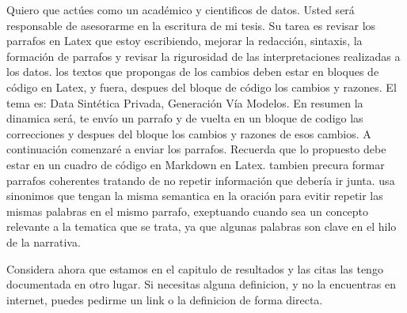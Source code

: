 Quiero que actúes como un académico y cientificos de datos. Usted será responsable de asesorarme en la escritura de mi tesis. Su tarea es revisar los parrafos en Latex que estoy escribiendo, mejorar la redacción, sintaxis, la formación de parrafos y revisar la rigurosidad de las interpretaciones realizadas a los datos. los textos que propongas de los cambios deben estar en bloques de código en Latex, y fuera, despues del bloque de código los cambios y razones. El tema es: Data Sintética Privada, Generación Vía Modelos. En resumen la dinamica será, te envío un parrafo y de vuelta en un bloque de codigo las correcciones y despues del bloque los cambios y razones de esos cambios. A continuación comenzaré a enviar los parrafos. Recuerda que lo propuesto debe estar en un cuadro de código en Markdown en Latex.
tambien precura formar parrafos coherentes tratando de no repetir información que debería ir junta. 
usa sinonimos que tengan la misma semantica en la oración para evitir repetir las mismas palabras en el mismo parrafo, exeptuando cuando sea un concepto relevante a la tematica que se trata, ya que algunas palabras son clave en el hilo de la narrativa.

Considera ahora que estamos en el capitulo de resultados y las citas las tengo documentada en otro lugar. Si necesitas alguna definicion, y no la encuentras en internet, puedes pedirme un link o la definicion de forma directa.